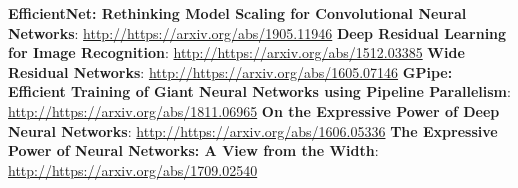 
\begin{thebibliography}{99}
\bibitem{}\textbf{EfficientNet: Rethinking Model Scaling for Convolutional Neural Networks}: \url{http://https://arxiv.org/abs/1905.11946}
\bibitem{}\textbf{Deep Residual Learning for Image Recognition}: \url{http://https://arxiv.org/abs/1512.03385}
\bibitem{}\textbf{Wide Residual Networks}: \url{http://https://arxiv.org/abs/1605.07146}
\bibitem{}\textbf{GPipe: Efficient Training of Giant Neural Networks using Pipeline Parallelism}: \url{http://https://arxiv.org/abs/1811.06965}
\bibitem{}\textbf{On the Expressive Power of Deep Neural Networks}: \url{http://https://arxiv.org/abs/1606.05336}
\bibitem{}\textbf{The Expressive Power of Neural Networks: A View from the Width}: \url{http://https://arxiv.org/abs/1709.02540}
\end{thebibliography}